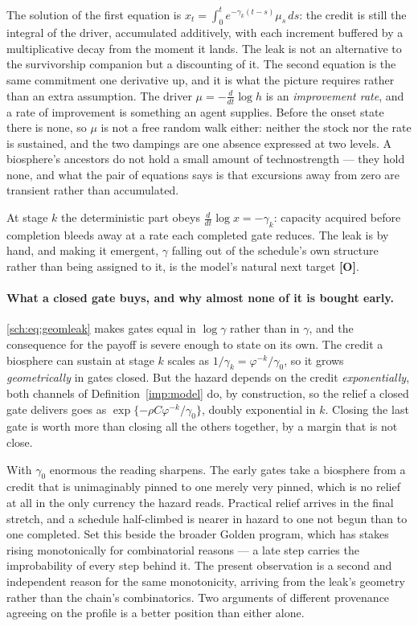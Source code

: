 \documentclass[11pt]{article}
\theoremstyle{plain}
\theoremstyle{definition}
\theoremstyle{remark}
\begin{document}
The solution of the first equation is
$x_t=\int_0^te^{-\gamma_k(t-s)}\mu_s\,ds$: the credit is still the
integral of the driver, accumulated additively, with each increment
buffered by a multiplicative decay from the moment it lands. The leak is
not an alternative to the survivorship companion \cite{SurvA} but a discounting of it. The second equation is the same commitment one derivative up, and it is
what the picture requires rather than an extra assumption. The driver
$\mu=-\tfrac{d}{dt}\log h$ is an \emph{improvement rate}, and a rate of
improvement is something an agent supplies. Before the onset state there
is none, so $\mu$ is not a free random walk either: neither the stock nor
the rate is sustained, and the two dampings are one absence expressed at
two levels. A biosphere's ancestors do not hold a small amount of
technostrength --- they hold none, and what the pair of equations says is
that excursions away from zero are transient rather than accumulated.

At stage $k$ the deterministic part obeys $\tfrac{d}{dt}\log x=-\gamma_k$:
capacity acquired before completion bleeds away at a rate each completed
gate reduces. The leak is by hand, and making it emergent, $\gamma$
falling out of the schedule's own structure rather than being assigned
to it, is the model's natural next target \textbf{[O]}.

\paragraph{What a closed gate buys, and why almost none of it is
bought early.}\label{sch:rem:backloaded}
\eqref{sch:eq:geomleak} makes gates equal in $\log\gamma$ rather than in
$\gamma$, and the consequence for the payoff is severe enough to state
on its own. The credit a biosphere can sustain at stage $k$ scales as
$1/\gamma_k=\varphi^{-k}/\gamma_0$, so it grows \emph{geometrically} in
gates closed. But the hazard depends on the credit \emph{exponentially}, both channels of Definition~\ref{imp:model} do, by construction, so the
relief a closed gate delivers goes as
$\exp\{-\rho C\varphi^{-k}/\gamma_0\}$, doubly exponential in $k$.
Closing the last gate is worth more than closing all the others
together, by a margin that is not close.

With $\gamma_0$ enormous the reading sharpens. The early gates take a
biosphere from a credit that is unimaginably pinned to one merely very
pinned, which is no relief at all in the only currency the hazard reads.
Practical relief arrives in the final stretch, and a schedule
half-climbed is nearer in hazard to one not begun than to one completed. Set this beside the broader Golden program, which has stakes rising
monotonically for combinatorial reasons --- a late step carries the
improbability of every step behind it. The present observation is a
second and independent reason for the same monotonicity, arriving from
the leak's geometry rather than the chain's combinatorics. Two arguments
of different provenance agreeing on the profile is a better position
than either alone.
\end{document}
